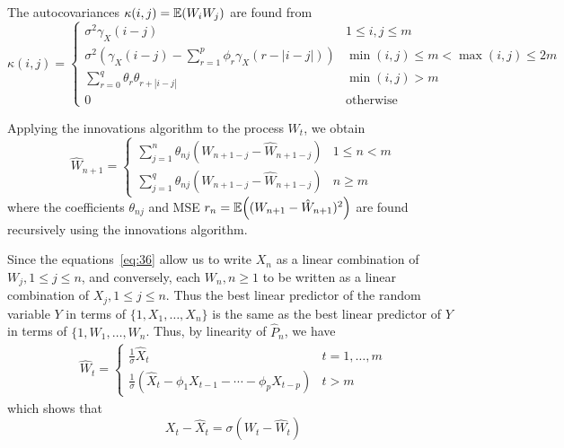 \begin{lem}
  The autocovariances $\kappa(i, j) = \E{W_{i} W_{j}}$ are found from
  \begin{equation}
    \label{eq:37}
    \kappa(i, j) =
    \begin{cases}
      \sigma^{2} \gamma_{X}(i - j) & 1 \leq i, j \leq m \\
      \sigma^{2} (\gamma_{X}(i - j) - \sum_{r=1}^{p} \phi_{r}
      \gamma_{X}(r - |i-j|)) & \min(i, j) \leq m < \max(i, j) \leq 2m
    \\
    \sum_{r=0}^{q}\theta_{r} \theta_{r + |i-j|} & \min(i, j) > m \\
    0 & \text{otherwise}
    \end{cases}
  \end{equation}

  Applying the innovations algorithm to the process $W_{t}$, we obtain
  \begin{equation}
    \label{eq:38}
    \hat W_{n+1} =
    \begin{cases}
      \sum_{j=1}^{n} \theta_{nj} (W_{n+1-j} - \hat W_{n+1-j}) & 1
      \leq n < m \\
      \sum_{j=1}^{q} \theta_{nj} (W_{n+1-j} - \hat W_{n+1-j}) & n \geq m
    \end{cases}
  \end{equation} where the coefficients $\theta_{nj}$ and MSE $r_{n} =
  \E{(W_{n+1} - \hat W_{n+1})^{2}}$ are found recursively using the
  innovations algorithm.

  Since the equations~\eqref{eq:36} allow us to write $X_{n}$ as a
  linear combination of $W_{j}, 1 \leq j \leq n$, and conversely, each
  $W_{n}, n \geq 1$ to be written as a linear combination of $X_{j}, 1
  \leq j \leq n$.  Thus the best linear predictor of the random
  variable $Y$  in terms of $\{ 1, X_{1}, \dots, X_{n} \}$ is the same
  as the best linear predictor of $Y$ in terms of $\{ 1, W_{1}, \dots,
  W_{n}$.  Thus, by linearity of $\hat P_{n}$, we have
  \begin{align}
    \label{eq:39}
    \hat W_{t} =
    \begin{cases}
      \frac{1}{\sigma} \hat X_{t} & t = 1, \dots, m \\
      \frac{1}{\sigma}(\hat X_{t} - \phi_{1} X_{t-1} - \cdots -
      \phi_{p} X_{t-p}) & t > m
    \end{cases}
  \end{align}
  which shows that
  \begin{equation}
    \label{eq:40}
    X_{t} - \hat X_{t} = \sigma(W_{t} - \hat W_{t})
  \end{equation}


\end{lem}
